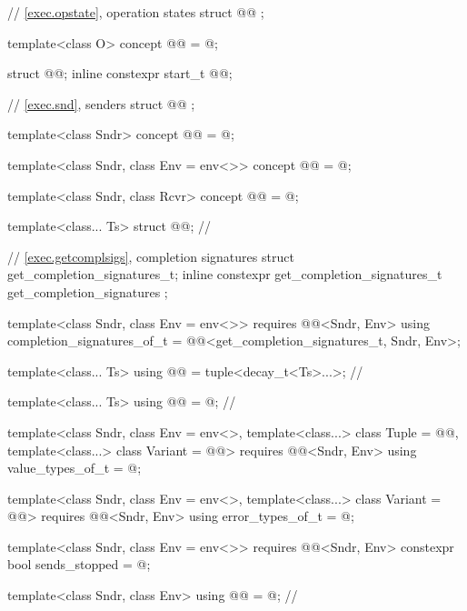 \begin{codeblock}
{  // \ref{exec.opstate}, operation states
  struct @@ {};

  template<class O>
    concept @@ = @\seebelow@;

  struct @@;
  inline constexpr start_t @@{};

  // \ref{exec.snd}, senders
  struct @@ {};

  template<class Sndr>
    concept @@ = @\seebelow@;

  template<class Sndr, class Env = env<>>
    concept @@ = @\seebelow@;

  template<class Sndr, class Rcvr>
    concept @@ = @\seebelow@;

  template<class... Ts>
    struct @@;                                           // \expos

  // \ref{exec.getcomplsigs}, completion signatures
  struct get_completion_signatures_t;
  inline constexpr get_completion_signatures_t get_completion_signatures {};

  template<class Sndr, class Env = env<>>
      requires @@<Sndr, Env>
    using completion_signatures_of_t = @@<get_completion_signatures_t, Sndr, Env>;

  template<class... Ts>
    using @@ = tuple<decay_t<Ts>...>;                // \expos

  template<class... Ts>
    using @@ = @\seebelownc@;                         // \expos

  template<class Sndr, class Env = env<>,
           template<class...> class Tuple = @@,
           template<class...> class Variant = @@>
      requires @@<Sndr, Env>
    using value_types_of_t = @\seebelow@;

  template<class Sndr, class Env = env<>,
           template<class...> class Variant = @@>
      requires @@<Sndr, Env>
    using error_types_of_t = @\seebelow@;

  template<class Sndr, class Env = env<>>
      requires @@<Sndr, Env>
    constexpr bool sends_stopped = @\seebelow@;

  template<class Sndr, class Env>
    using @@ = @\seebelownc@;                 // \expos

}
\end{codeblock}
